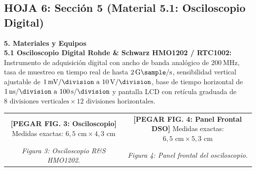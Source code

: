 \documentclass[a4paper, 11pt]{article}
\begin{document}
\subsection*{\color{uni-blue} HOJA 6: Sección 5 (Material 5.1: Osciloscopio Digital)}
\begin{tcolorbox}[title=Texto a Escribir: Sección 5 (Material 5.1), colframe=black]
    \small
    \textbf{\large 5. Materiales y Equipos}\\[0.2cm]
    \textbf{5.1 Osciloscopio Digital Rohde \& Schwarz HMO1202 / RTC1002:}\\[0.15cm]
    Instrumento de adquisición digital con ancho de banda analógico de $\qty{200}{\mega\hertz}$, tasa de muestreo en tiempo real de hasta $\qty{2}{\giga\sample\per\second}$, sensibilidad vertical ajustable de $\qty{1}{\milli\volt\per\division}\text{ a }\qty{10}{\volt\per\division}$, base de tiempo horizontal de $\qty{1}{\nano\second\per\division}\text{ a }\qty{100}{\second\per\division}$ y pantalla LCD con retícula graduada de $8\text{ divisiones verticales} \times 12\text{ divisiones horizontales}$.\\[0.3cm]
    
    \begin{center}
        \begin{tabular}{cc}
            \fbox{\parbox[c][4.34cm][c]{6.5cm}{\centering\scriptsize\color{gray}\textbf{[PEGAR FIG. 3: Osciloscopio]}\\[1mm] Medidas exactas: $6{,}5\text{ cm} \times 4{,}3\text{ cm}$}} &
            \fbox{\parbox[c][5.25cm][c]{6.5cm}{\centering\scriptsize\color{gray}\textbf{[PEGAR FIG. 4: Panel Frontal DSO]}\\[1mm] Medidas exactas: $6{,}5\text{ cm} \times 5{,}3\text{ cm}$}} \\
            {\scriptsize\textit{Figura 3: Osciloscopio R\&S HMO1202.}} & {\scriptsize\textit{Figura 4: Panel frontal del osciloscopio.}}
        \end{tabular}
    \end{center}
\end{tcolorbox}

\newpage

\end{document}
